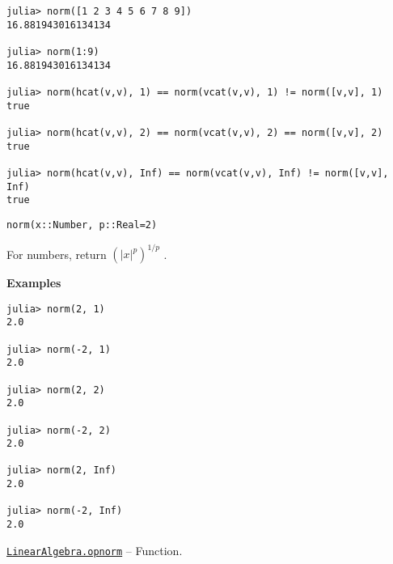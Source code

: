 \begin{adjustwidth}{2em}{0pt}
\begin{verbatim}
julia> norm([1 2 3 4 5 6 7 8 9])
16.881943016134134

julia> norm(1:9)
16.881943016134134

julia> norm(hcat(v,v), 1) == norm(vcat(v,v), 1) != norm([v,v], 1)
true

julia> norm(hcat(v,v), 2) == norm(vcat(v,v), 2) == norm([v,v], 2)
true

julia> norm(hcat(v,v), Inf) == norm(vcat(v,v), Inf) != norm([v,v], Inf)
true
\end{verbatim}




\begin{lstlisting}
norm(x::Number, p::Real=2)
\end{lstlisting}

For numbers, return  \(\left( |x|^p \right)^{1/p}\) .

\textbf{Examples}


\begin{verbatim}
julia> norm(2, 1)
2.0

julia> norm(-2, 1)
2.0

julia> norm(2, 2)
2.0

julia> norm(-2, 2)
2.0

julia> norm(2, Inf)
2.0

julia> norm(-2, Inf)
2.0
\end{verbatim}



\end{adjustwidth}
\hypertarget{4740175223212326101}{}
\hyperlink{4740175223212326101}{\texttt{LinearAlgebra.opnorm}}  -- {Function.}

